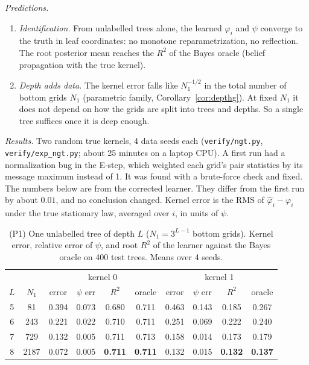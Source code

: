 \documentclass[11pt]{article}
\theoremstyle{definition}
\begin{document}
\emph{Predictions.}
\begin{enumerate}
\item[(P1)] \emph{Identification.} From unlabelled trees alone, the learned $\varphi_i$ and $\psi$
converge to the truth in leaf coordinates: no monotone reparametrization, no reflection. The root
posterior mean reaches the $R^2$ of the Bayes oracle (belief propagation with the true kernel).
\item[(P2)] \emph{Depth adds data.} The kernel error falls like $N_1^{-1/2}$ in the total number of
bottom grids $N_1$ (parametric family, Corollary~\ref{cor:depthg}). At fixed $N_1$ it does not depend on
how the grids are split into trees and depths. So a single tree suffices once it is deep enough.
\end{enumerate}

\emph{Results.} Two random true kernels, 4 data seeds each (\texttt{verify/ngt.py},
\texttt{verify/exp\_ngt.py}; about 25 minutes on a laptop CPU). A first run had a normalization bug
in the E-step, which weighted each grid's pair statistics by its message maximum instead of 1. It was
found with a brute-force check and fixed. The numbers below are from the corrected learner. They differ
from the first run by about $0.01$, and no conclusion changed. Kernel error is the RMS of
$\hat\varphi_i-\varphi_i$ under the true stationary law, averaged over $i$, in units of $\psi$.

\begin{table}[h]\centering
\caption{(P1) One unlabelled tree of depth $L$ ($N_1=3^{L-1}$ bottom grids). Kernel error, relative
error of $\psi$, and root $R^2$ of the learner against the Bayes oracle on 400 test trees. Means over
4 seeds.}\label{tab:v1p1}
\small\begin{tabular}{cc|cccc|cccc}\toprule
&& \multicolumn{4}{c|}{kernel 0} & \multicolumn{4}{c}{kernel 1}\\
$L$ & $N_1$ & error & $\psi$ err & $R^2$ & oracle & error & $\psi$ err & $R^2$ & oracle\\\midrule
5 & 81 & 0.394 & 0.073 & 0.680 & 0.711 & 0.463 & 0.143 & 0.185 & 0.267\\
6 & 243 & 0.221 & 0.022 & 0.710 & 0.711 & 0.251 & 0.069 & 0.222 & 0.240\\
7 & 729 & 0.132 & 0.005 & 0.711 & 0.713 & 0.158 & 0.014 & 0.173 & 0.179\\
8 & 2187 & 0.072 & 0.005 & \textbf{0.711} & \textbf{0.711} & 0.132 & 0.015 & \textbf{0.132} & \textbf{0.137}\\
\bottomrule\end{tabular}
\end{table}
\end{document}

